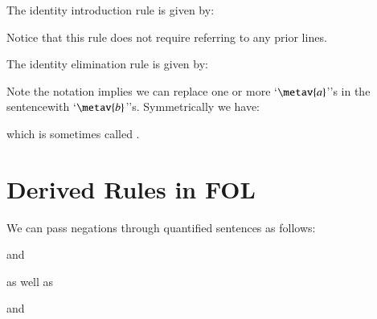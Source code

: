 \begin{definition}
    The identity introduction rule is given by: \begin{fitchproof}
         
    \end{fitchproof}
    Notice that this rule does not require referring to any prior lines.
\end{definition}

\begin{definition}
    The identity elimination rule is given by:\begin{fitchproof}
         
    \end{fitchproof}
    Note the notation implies we can replace one or more `$\metav{a}$''s in the sentencewith `$\metav{b}$''s. Symmetrically we have:\begin{fitchproof}
         
    \end{fitchproof}
    which is sometimes called .
\end{definition}


\section{ Derived Rules in FOL}

\begin{definition}
    We can pass negations through quantified sentences as follows:
    \begin{fitchproof}
         
    \end{fitchproof}
    and \begin{fitchproof}
         
    \end{fitchproof}
    as well as \begin{fitchproof}
         
    \end{fitchproof}
    and \begin{fitchproof}
         
    \end{fitchproof}
\end{definition}



